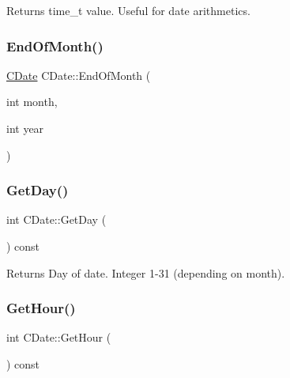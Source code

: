 \begin{DoxyReturn}{Returns}
time\+\_\+t value. Useful for date arithmetics. 
\end{DoxyReturn}
\mbox{\label{class_c_date_ae4943e159d1375cf8e90474131d821a2}} 
\subsubsection{\texorpdfstring{End\+Of\+Month()}{EndOfMonth()}}
{\footnotesize\ttfamily \mbox{\hyperlink{class_c_date}{C\+Date}} C\+Date\+::\+End\+Of\+Month (\begin{DoxyParamCaption}\item[{int}]{month,  }\item[{int}]{year }\end{DoxyParamCaption})\hspace{0.3cm}{\ttfamily [static]}}

\mbox{\label{class_c_date_a0ca574460424a4d3bd626de64077ea04}} 
\subsubsection{\texorpdfstring{Get\+Day()}{GetDay()}}
{\footnotesize\ttfamily int C\+Date\+::\+Get\+Day (\begin{DoxyParamCaption}{ }\end{DoxyParamCaption}) const\hspace{0.3cm}{\ttfamily [inline]}}

\begin{DoxyReturn}{Returns}
Day of date. Integer 1-\/31 (depending on month). 
\end{DoxyReturn}
\mbox{\label{class_c_date_a87aa91727803b813e167480856778f9a}} 
\subsubsection{\texorpdfstring{Get\+Hour()}{GetHour()}}
{\footnotesize\ttfamily int C\+Date\+::\+Get\+Hour (\begin{DoxyParamCaption}{ }\end{DoxyParamCaption}) const\hspace{0.3cm}{\ttfamily [inline]}}


